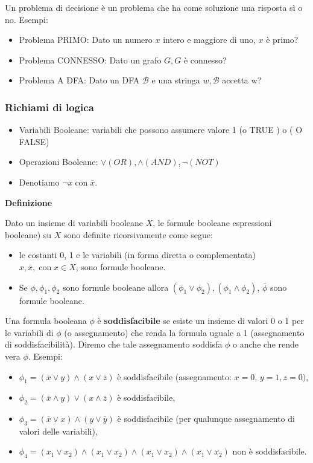 Un problema di decisione è un problema che ha come soluzione una risposta sì o no.
Esempi:
\begin{itemize}
    \item Problema PRIMO: Dato un numero $x$ intero e maggiore di uno, $x$ è primo?
    \item  Problema CONNESSO: Dato un grafo $G, G$ è connesso?
    \item Problema A DFA: Dato un DFA $\mathcal{B}$ e una stringa $w, \mathcal{B}$ accetta w?
\end{itemize}

\subsubsection{Richiami di logica}

\begin{itemize}
    \item Variabili Booleane: variabili che possono assumere valore 1 (o TRUE ) o ( O FALSE)
    \item Operazioni Booleane: $\vee( O R), \wedge( A N D), \neg( N O T)$
    \item Denotiamo $\neg x \operatorname{con} \bar{x}$.
\end{itemize}

\textbf{Definizione}

Dato un insieme di variabili booleane $X$, le formule booleane espressioni booleane) su $X$ sono definite ricorsivamente come segue:
\begin{itemize}
    \item le costanti 0, 1 e le variabili (in forma diretta o complementata) $x, \bar{x}, \operatorname{con} x \in X$, sono formule booleane.
    \item Se $\phi, \phi_{1}, \phi_{2}$ sono formule booleane allora $\left(\phi_{1} \vee \phi_{2}\right),\left(\phi_{1} \wedge \phi_{2}\right)$, $\bar{\phi}$ sono formule booleane.
\end{itemize}

Una formula booleana $\phi$ è \textbf{soddisfacibile} se esiste un insieme di valori 0 o 1 per le variabili di $\phi$ (o assegnamento) che renda la formula uguale a 1 (assegnamento di soddisfacibilità). Diremo che tale assegnamento soddisfa $\phi$ o anche che rende vera $\phi$.
Esempi:
\begin{itemize}
    \item $\phi_{1}=(\bar{x} \vee y) \wedge(x \vee \bar{z})$ è soddisfacibile (assegnamento: $x=0$, $y=1, z=0)$,
    \item $\phi_{2}=(\bar{x} \wedge y) \vee(x \wedge \bar{z})$ è soddisfacibile,
    \item $\phi_{3}=(\bar{x} \vee x) \wedge(y \vee \bar{y})$ è soddisfacibile (per qualunque assegnamento di valori delle variabili),
    \item $\phi_{4}=\left(x_{1} \vee x_{2}\right) \wedge\left(x_{1} \vee \overline{x_{2}}\right) \wedge\left(\overline{x_{1}} \vee x_{2}\right) \wedge\left(\overline{x_{1}} \vee \overline{x_{2}}\right)$ non è soddisfacibile.
\end{itemize}

